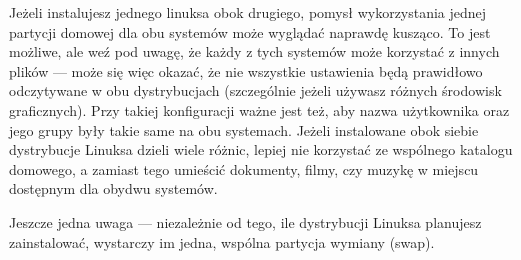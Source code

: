 Jeżeli instalujesz jednego linuksa obok drugiego, pomysł wykorzystania jednej partycji domowej dla obu systemów może wyglądać naprawdę kusząco. To jest możliwe, ale weź pod uwagę, że każdy z tych systemów może korzystać z innych plików --- może się więc okazać, że nie wszystkie ustawienia będą prawidłowo odczytywane w obu dystrybucjach (szczególnie jeżeli używasz różnych środowisk graficznych). Przy takiej konfiguracji ważne jest też, aby nazwa użytkownika oraz jego grupy były takie same na obu systemach. Jeżeli instalowane obok siebie dystrybucje Linuksa dzieli wiele różnic, lepiej nie korzystać ze wspólnego katalogu domowego, a zamiast tego umieścić dokumenty, filmy, czy muzykę w miejscu dostępnym dla obydwu systemów.

Jeszcze jedna uwaga --- niezależnie od tego, ile dystrybucji Linuksa planujesz zainstalować, wystarczy im jedna, wspólna partycja wymiany (swap).

